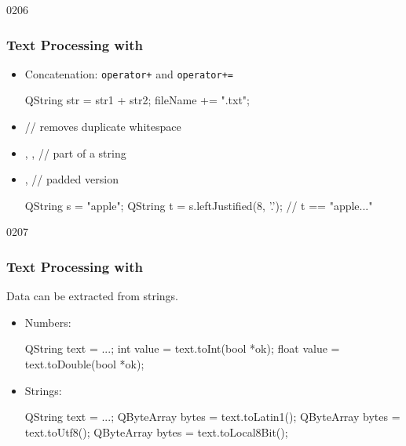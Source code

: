 \begin{slide}[fragile]{0206}\frametitle{Text Processing with }
  \begin{itemize}
    \item Concatenation: \texttt{operator+} and \texttt{operator+=}    
 \begin{cpp}    
QString str = str1 + str2;
fileName += ".txt";
  \end{cpp}\medskip
 \item {} // removes duplicate whitespace
 \item{}, ,
    // part of a string\medskip
  \item {},
     // padded version
 \begin{cpp}
QString s = "apple";
QString t = s.leftJustified(8, '.'); // t == "apple..."
  \end{cpp}
  \end{itemize}
\end{slide}

\begin{slide}[fragile]{0207}\frametitle{Text Processing with }
  Data can be extracted from strings.
  \vspace*{1em}
  
  \begin{itemize}
  \item Numbers:
 \begin{cpp}
QString text = ...; 
int value = text.toInt(bool *ok);
float value = text.toDouble(bool *ok);
  \end{cpp}
 \item Strings:
 \begin{cpp}
QString text = ...;
QByteArray bytes = text.toLatin1();
QByteArray bytes = text.toUtf8();
QByteArray bytes = text.toLocal8Bit();
  \end{cpp}
  \end{itemize}
\end{slide}


